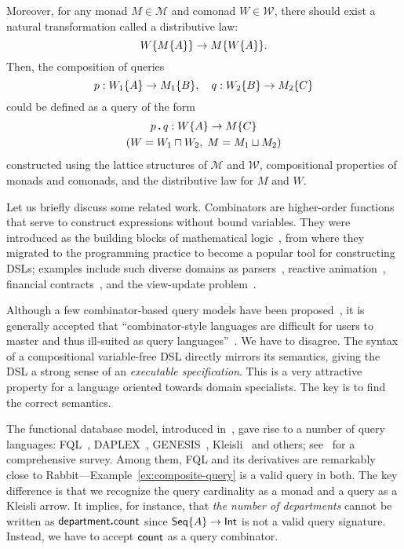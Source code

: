Moreover, for any monad $M\in\mathcal{M}$ and comonad $W\in\mathcal{W}$, there
should exist a natural transformation called a distributive law:
\begin{equation*}
    W{\left\{M{\left\{A\right\}}\right\}} \to M{\left\{W{\left\{A\right\}}\right\}}.
\end{equation*}
Then, the composition of queries
\begin{equation*}
    p : W_1{\left\{A\right\}} \to M_1{\left\{B\right\}}, \quad q : W_2{\left\{B\right\}} \to M_2{\left\{C\right\}}
\end{equation*}
could be defined as a query of the form
\begin{multline*}
    p\,\boldsymbol{.}\,q : W{\left\{A\right\}} \to M{\left\{C\right\}} \\ (W = W_1 \sqcap W_2,\; M = M_1 \sqcup M_2)
\end{multline*}
constructed using the lattice structures of $\mathcal{M}$ and $\mathcal{W}$,
compositional properties of monads and comonads, and the distributive law for
$M$ and $W$.

Let us briefly discuss some related work.  Combinators are higher-order
functions that serve to construct expressions without bound variables.  They
were introduced as the building blocks of mathematical
logic~\cite{Schoenfinkel1924, Curry1930}, from where they migrated to the
programming practice to become a popular tool for constructing DSLs; examples
include such diverse domains as parsers~\cite{Wadler1985, Hutton1996}, reactive
animation~\cite{Elliott1997}, financial contracts~\cite{Jones2000}, and
the view-update problem~\cite{Foster2005}.

Although a few combinator-based query models have been
proposed~\cite{Buneman1979, Bossi1984, Batory1988, Erwig1991, Cherniack1996},
it is generally accepted that ``combinator-style languages are difficult for
users to master and thus ill-suited as query languages''~\cite{Cherniack1996}.
We have to disagree.  The syntax of a compositional variable-free DSL
directly mirrors its semantics, giving the DSL a strong sense of an
\emph{executable specification}.  This is a very attractive property for a
language oriented towards domain specialists.  The key is to find the correct
semantics.

The functional database model, introduced in~\cite{Kerschberg1976, Sibley1977},
gave rise to a number of query languages: FQL~\cite{Buneman1979},
DAPLEX~\cite{Shipman1981}, GENESIS~\cite{Batory1988}, Kleisli~\cite{Wong2000}
and others; see~\cite{Gray2004} for a comprehensive survey.  Among them, FQL
and its derivatives are remarkably close to
Rabbit---Example~\ref{ex:composite-query} is a valid query in both.  The key
difference is that we recognize the query cardinality as a monad and a query as
a Kleisli arrow.  It implies, for instance, that \emph{the number of
departments} cannot be written as $\mathsf{department}\boldsymbol{.}\mathsf{count}$ since $\mathsf{Seq}{\left\{A\right\}}\to\mathsf{Int}$
is not a valid query signature.  Instead, we have to accept $\mathsf{count}$ as a query
combinator.


